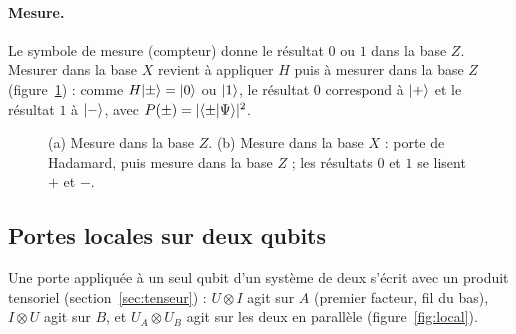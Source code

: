 \paragraph{Mesure.} Le symbole de mesure (compteur) donne le résultat $0$ ou $1$ dans la base $Z$.
Mesurer dans la base $X$ revient à appliquer $H$ puis à mesurer dans la base $Z$
(figure~\ref{fig:mesurex}) : comme $H|\pm\rangle=|0\rangle$ ou $|1\rangle$, le résultat $0$ correspond à
$|+\rangle$ et le résultat $1$ à $|-\rangle$, avec $P(\pm)=|\langle \pm|\Psi\rangle|^2$.

\begin{figure}[!ht]
\centering
{}
\caption{(a) Mesure dans la base $Z$. (b) Mesure dans la base $X$ : porte de Hadamard, puis
mesure dans la base $Z$ ; les résultats $0$ et $1$ se lisent $+$ et $-$.}
\label{fig:mesurex}
\end{figure}

\subsection{Portes locales sur deux qubits}\label{sec:op2}

Une porte appliquée à un seul qubit d'un système de deux s'écrit avec un produit tensoriel
(section~\ref{sec:tenseur}) : $U\otimes I$ agit sur $A$ (premier facteur, fil du bas), $I\otimes U$
agit sur $B$, et $U_A\otimes U_B$ agit sur les deux en parallèle (figure~\ref{fig:local}).


